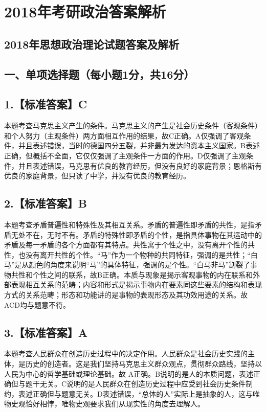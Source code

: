 \documentclass[UTF8,11pt]{ctexart}
\begin{document}
\section*{2018年考研政治答案解析}
\subsection*{2018年思想政治理论试题答案及解析}

\subsection*{一、单项选择题（每小题1分，共16分）}

\subsection*{1.【标准答案】C}

本题考查马克思主义产生的条件。马克思主义的产生是社会历史条件（客观条件）和个人努力（主观条件）两方面相互作用的结果，故C正确。A仅强调了客观条件，并且表述错误，当时的德国四分五裂，并非最为发达的资本主义国家。B表述正确，但概括不全面，它仅仅强调了主观条件一方面的作用。D仅强调了主观条件，并且表述错误，马克思有优良的教育经历，但没有良好的家庭背景；恩格斯有优良的家庭背景，但只读了中学，并没有优良的教育经历。


\subsection*{2.【标准答案】B}

本题考查矛盾普遍性和特殊性及其相互关系。矛盾的普遍性即矛盾的共性，是指矛盾无处不在，无时不有。矛盾的特殊性即矛盾的个性，是指具体事物在其运动中的矛盾及每一矛盾的各个方面都有其特点。共性寓于个性之中，没有离开个性的共性，也没有离开共性的个性。“马”作为一个物种的共同特征，强调的是共性；“白马”是从颜色的角度来说明“马”的具体特征，强调的是个性。“白马非马”割裂了事物共性和个性之间的联系，故B正确。本质与现象是揭示客观事物的内在联系和外部表现相互关系的范畴；内容和形式是揭示事物内在要素同这些要素的结构和表现方式的关系范畴；形态和功能讲的是事物的表现形态及其功效用途的关系。故 ACD均与题意不符。


\subsection*{3.【标准答案】A}

本题考查人民群众在创造历史过程中的决定作用。人民群众是社会历史实践的主体，是历史的创造者。这是我们坚持马克思主义群众观点，贯彻群众路线，坚持以人民为中心的哲学基础或理论基础。故 A正确。B说明的是人的本质问题，表述正确但与题干无关。C说明的是人民群众在创造历史过程中应受到社会历史条件制约，表述正确但与题意无关。D表述错误，“总体的人”实际上是抽象的人，这与唯物史观恰好相悖，唯物史观要求我们从现实性的角度去理解人。
\end{document}
